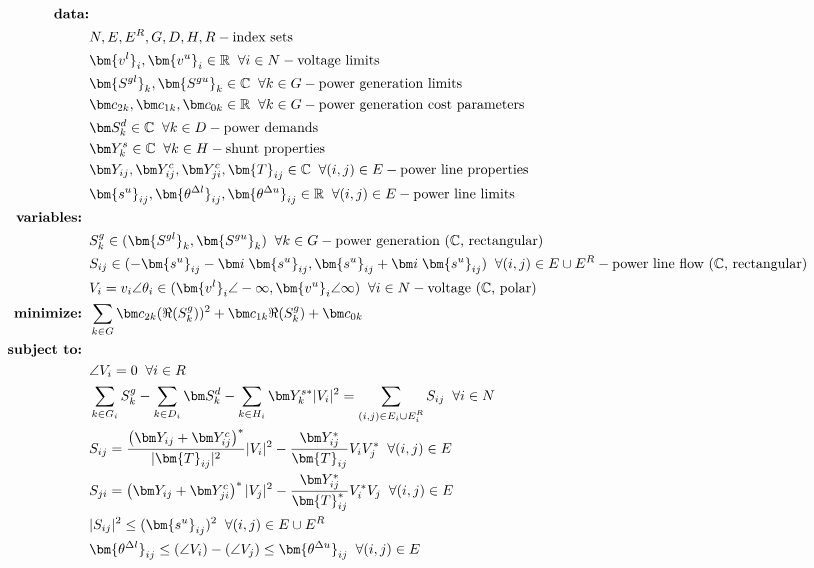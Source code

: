 \begin{align}
%
\mbox{\bf data:} & \nonumber \\ 
& N, E, E^R, G, D, H, R - \mbox{index sets} \nonumber \\ 
& \bm {v^l}_i, \bm {v^u}_i \in \mathbb{R} \;\; \forall i \in N - \mbox{voltage limits} \nonumber \\
& \bm {S^{gl}}_k, \bm {S^{gu}}_k \in \mathbb{C} \;\; \forall k \in G - \mbox{power generation limits} \nonumber \\
& \bm c_{2k}, \bm c_{1k}, \bm c_{0k} \in \mathbb{R} \;\; \forall k \in G - \mbox{power generation cost parameters} \nonumber \\
& \bm S^d_k \in \mathbb{C} \;\; \forall k \in D - \mbox{power demands} \nonumber \\
& \bm Y^s_k \in \mathbb{C} \;\; \forall k \in H - \mbox{shunt properties} \nonumber \\
& \bm Y_{ij}, \bm Y^c_{ij}, \bm Y^c_{ji}, \bm{T}_{ij} \in \mathbb{C} \;\; \forall (i,j) \in E - \mbox{power line properties} \nonumber \\
& \bm {s^u}_{ij}, \bm {\theta^{\Delta l}}_{ij}, \bm {\theta^{\Delta u}}_{ij} \in \mathbb{R} \;\; \forall (i,j) \in E - \mbox{power line limits} \nonumber \\
%
\mbox{\bf variables: } & \nonumber \\
& S^g_k \in (\bm {S^{gl}}_k, \bm {S^{gu}}_k) \;\; \forall k\in G - \mbox{power generation ($\mathbb{C}$, rectangular)} \nonumber \\
& S_{ij} \in (-\bm {s^u}_{ij} - \bm i \;
 \bm {s^u}_{ij}, \bm {s^u}_{ij} + \bm i \;
 \bm {s^u}_{ij}) \;\; \forall (i,j) \in E \cup E^R - \mbox{power line flow ($\mathbb{C}$, rectangular)} \nonumber \\
& V_i = v_i \angle \theta_i \in (\bm {v^l}_i \angle -\infty, \bm {v^u}_i \angle \infty) \;\; \forall i\in N \nonumber - \mbox{voltage ($\mathbb{C}$, polar)} \\
%
\mbox{\bf minimize: } & \sum_{k \in G} \bm c_{2k} (\Re(S^g_k))^2 + \bm c_{1k}\Re(S^g_k) + \bm c_{0k} \\
%
\mbox{\bf subject to: } & \nonumber \\
& \angle V_i = 0 \;\; \forall i \in R \\
& \sum_{\substack{k \in G_i}} S^g_k - \sum_{\substack{k \in D_i}} \bm S^d_k - \sum_{\substack{k \in H_i}} \bm Y^{s*}_k |V_i|^2 = \sum_{\substack{(i,j)\in E_i \cup E_i^R}} S_{ij} \;\; \forall i \in N \\ 
& S_{ij} = \frac{\left( \bm Y_{ij} + \bm Y^c_{ij} \right)^*}{|\bm{T}_{ij}|^2} |V_i|^2 - \frac{\bm Y^*_{ij}}{\bm{T}_{ij}} V_i V^*_j \;\; \forall (i,j)\in E \\
& S_{ji} = \left( \bm Y_{ij} + \bm Y^c_{ji}  \right)^* |V_j|^2 - \frac{\bm Y^*_{ij}}{\bm{T}^*_{ij}} V^*_i V_j \;\; \forall (i,j)\in E \\
& |S_{ij}|^2 \leq (\bm {s^u}_{ij})^2 \;\; \forall (i,j) \in E \cup E^R \\
& \bm {\theta^{\Delta l}}_{ij} \leq (\angle V_i) - (\angle V_j) \leq \bm {\theta^{\Delta u}}_{ij} \;\; \forall (i,j) \in E
%
\end{align}